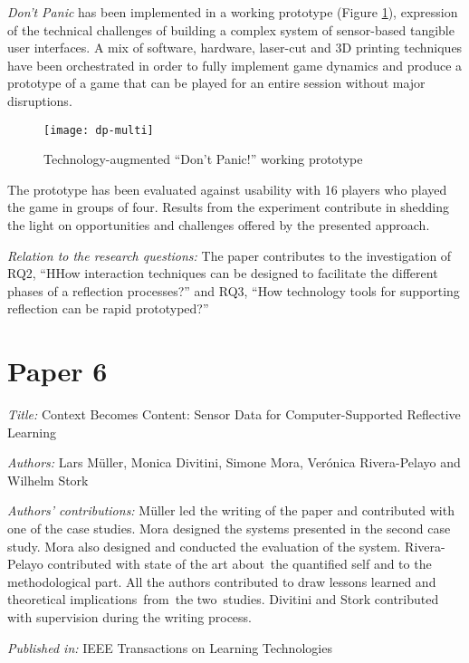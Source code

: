 \emph{Don't Panic} has been implemented in a working prototype (Figure
\ref{fig:dp-token}), expression of the technical challenges of building
a complex system of sensor-based tangible user interfaces. A mix of
software, hardware, laser-cut and 3D printing techniques have been
orchestrated in order to fully implement game dynamics and produce a
prototype of a game that can be played for an entire session without
major disruptions.

\begin{figure}[tbh]
    \centering
    \texttt{[image: dp-multi]}
    \caption{Technology-augmented “Don't Panic!” working prototype}
    \label{fig:dp-token}
\end{figure}

The prototype has been evaluated against usability with 16 players who
played the game in groups of four. Results from the experiment
contribute in shedding the light on opportunities and challenges offered
by the presented approach.

\emph{Relation to the research questions: } The paper contributes to the
investigation of RQ2, ``HHow interaction techniques can be designed to
facilitate the different phases of a reflection processes?'' and RQ3,
``How technology tools for supporting reflection can be rapid
prototyped?''

\section{Paper 6}\label{paper-6}

\emph{Title:} Context Becomes Content: Sensor Data for
Computer-Supported Reflective Learning

\emph{Authors:} Lars Müller, Monica Divitini, Simone Mora, Verónica
Rivera-Pelayo and Wilhelm Stork

\emph{Authors' contributions:} Müller led the writing of the paper and
contributed with one of the case studies. Mora designed the systems
presented in the second case study. Mora also designed and conducted the
evaluation of the system. Rivera-Pelayo contributed with state of the
art about~the quantified self and to the methodological part. All the
authors contributed to draw lessons learned and theoretical
implications~from~the two~studies. Divitini and Stork contributed with
supervision during the writing process.

\emph{Published in:} IEEE Transactions on Learning Technologies

